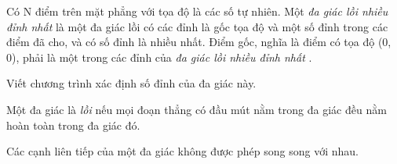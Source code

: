 Có N điểm trên mặt phẳng với tọa độ là các số tự nhiên. Một   \textit{    đa giác lồi nhiều đỉnh nhất   }   là một đa giác lồi có các đỉnh là       gốc tọa độ      và một số đỉnh trong các điểm đã cho, và có số đỉnh là nhiều nhất. Điểm gốc, nghĩa là điểm có tọa độ (0, 0),       phải      là một trong các đỉnh của   \textit{    đa giác lồi nhiều đỉnh nhất   }   .  

   Viết chương trình xác định số đỉnh của đa giác này.  

   Một đa giác là   \textit{    lồi   }   nếu mọi đoạn thẳng có đầu mút nằm trong đa giác đều nằm hoàn toàn trong đa giác đó.  

   Các cạnh liên tiếp của một đa giác không được phép song song với nhau.